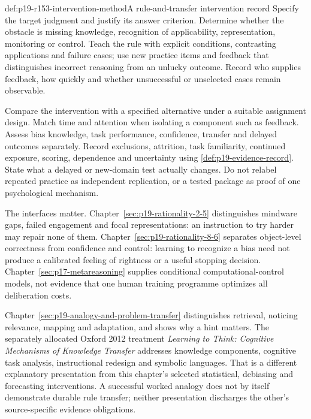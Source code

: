 \begin{hbmethod}{def:p19-r153-intervention-method}{A rule-and-transfer intervention record}
Specify the target judgment and justify its answer criterion. Determine
whether the obstacle is missing knowledge, recognition of applicability,
representation, monitoring or control. Teach the rule with explicit
conditions, contrasting applications and failure cases; use new practice
items and feedback that distinguishes incorrect reasoning from an
unlucky outcome. Record who supplies feedback, how quickly and whether
unsuccessful or unselected cases remain observable.

Compare the intervention with a specified alternative under a suitable
assignment design. Match time and attention when isolating a component
such as feedback. Assess bias knowledge, task performance, confidence,
transfer and delayed outcomes separately. Record exclusions, attrition,
task familiarity, continued exposure, scoring, dependence and uncertainty
using \ref{def:p19-evidence-record}. State what a delayed or new-domain
test actually changes. Do not relabel repeated practice as independent
replication, or a tested package as proof of one psychological mechanism.
\end{hbmethod}

The interfaces matter. Chapter~\ref{sec:p19-rationality-2-5} distinguishes
mindware gaps, failed engagement and focal representations: an instruction
to try harder may repair none of them. Chapter~\ref{sec:p19-rationality-8-6}
separates object-level correctness from confidence and control: learning
to recognize a bias need not produce a calibrated feeling of rightness
or a useful stopping decision. Chapter~\ref{sec:p17-metareasoning} supplies
conditional computational-control models, not evidence that one human
training programme optimizes all deliberation costs.

Chapter~\ref{sec:p19-analogy-and-problem-transfer} distinguishes retrieval,
noticing relevance, mapping and adaptation, and shows why a hint matters.
The separately allocated Oxford 2012 treatment \emph{Learning to Think:
Cognitive Mechanisms of Knowledge Transfer} addresses knowledge components,
cognitive task analysis, instructional redesign and symbolic languages.
That is a different explanatory presentation from this chapter's selected
statistical, debiasing and forecasting interventions. A successful worked
analogy does not by itself demonstrate durable rule transfer; neither
presentation discharges the other's source-specific evidence obligations.

